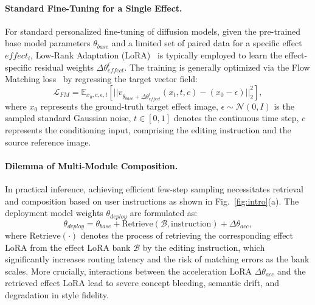 \paragraph{Standard Fine-Tuning for a Single Effect.}
For standard personalized fine-tuning of diffusion models, given the pre-trained base model parameters $\theta_{base}$ and a limited set of paired data for a specific effect $effect_i$, Low-Rank Adaptation (LoRA)~\cite{LoRA} is typically employed to learn the effect-specific residual weights $\Delta\theta_{effect}^{i}$.
The training is generally optimized via the Flow Matching loss~\cite{lipman2023flowmatchinggenerativemodeling} by regressing the target vector field:
\begin{equation}
    \mathcal{L}_{FM} = \mathbb{E}_{x_0, c, \epsilon, t} [||v_{\theta_{base} + \Delta\theta_{effect}^{i}}(x_t, t, c) - (x_0 - \epsilon)||_2^2],
\end{equation}
where $x_0$ represents the ground-truth target effect image, $\epsilon \sim \mathcal{N}(0, I)$ is the sampled standard Gaussian noise, $t \in [0, 1]$ denotes the continuous time step, $c$ represents the conditioning input, comprising the editing instruction and the source reference image.
\paragraph{Dilemma of Multi-Module Composition.}
In practical inference, achieving efficient few-step sampling necessitates retrieval and composition based on user instructions as shown in Fig.~\ref{fig:intro}(a). The deployment model weights $\theta_{deploy}$ are formulated as:
\begin{equation}
    \theta_{deploy}=\theta_{base}+\text{Retrieve}(\mathcal{B},\text{instruction})+\Delta\theta_{acc},
\end{equation}
where $\text{Retrieve}(\cdot)$ denotes the process of retrieving the corresponding effect LoRA from the effect LoRA bank $\mathcal{B}$ by the editing instruction, which significantly increases routing latency and the risk of matching errors as the bank scales. More crucially, interactions between the acceleration LoRA $\Delta\theta_{acc}$ and the retrieved effect LoRA lead to severe concept bleeding, semantic drift, and degradation in style fidelity.
